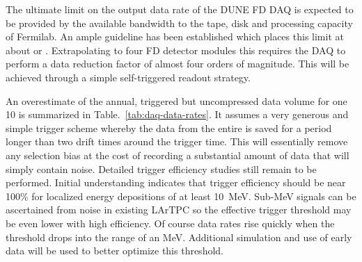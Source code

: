 The ultimate limit on the output data rate of the DUNE FD DAQ is
expected to be provided by the available bandwidth to the tape,
disk and processing capacity of Fermilab. 
An ample guideline has been established which places this limit at
about \offsitepbpy or \offsitegbps.
Extrapolating to four FD detector modules this requires the DAQ to
perform a data reduction factor of almost four orders of magnitude. 
This will be achieved through a simple self-triggered readout strategy.

An overestimate of the annual, triggered but uncompressed data volume
for one \SI{10}{\kton}  is summarized in
Table.~\ref{tab:daq-data-rates}. 
It assumes a very generous and simple trigger scheme whereby the data
from the entire  is saved for a period longer than
two drift times around the trigger time.
This will essentially remove any selection bias at the cost of
recording a substantial amount of data that will simply contain noise.
Detailed trigger efficiency studies still remain to be performed. 
Initial understanding indicates that trigger efficiency should be near
100\% for localized energy depositions of at least \SI{10}{\MeV}. 
Sub-\si{\MeV} signals can be ascertained from noise in existing LArTPC
so the effective trigger threshold may be even lower with high
efficiency. 
Of course data rates rise quickly when the threshold drops into the
range of an \si{\MeV}. 
Additional simulation and use of early data will be used to better
optimize this threshold.


